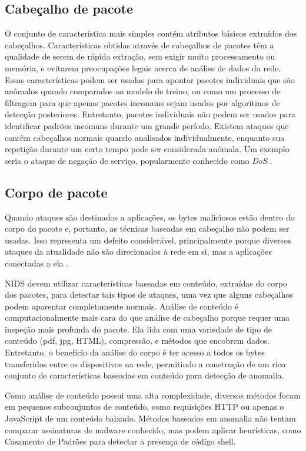 \subsection{Cabeçalho de pacote}
O conjunto de característica mais simples contém atributos básicos extraídos dos cabeçalhos.
Características obtidas através de  cabeçalhos de pacotes têm a qualidade de serem de rápida extração, sem exigir muito
processamento ou memória, e evitarem preocupações legais acerca de análise de dados da rede.
Essas características podem ser usadas para apontar pacotes individuais que são anômalos quando comparados ao modelo de
treino; ou como um processo de filtragem para que apenas pacotes incomuns sejam usados por algoritmos de detecção
posteriores.
Entretanto, pacotes individuais não podem ser usados para identificar padrões incomuns durante um grande período.
Existem ataques que contêm cabeçalhos normais quando analisados individualmente, enquanto sua repetição durante
um certo tempo pode ser considerada anômala. Um exemplo seria o ataque de negação de serviço, popularmente conhecido
como \textit{DoS} \cite{catania12}.

\subsection{Corpo de pacote}
Quando ataques são destinados a aplicações, os bytes maliciosos estão dentro do corpo do
pacote e, portanto, as técnicas baseadas em cabeçalho não podem ser usadas. Isso representa um defeito considerável,
principalmente porque diversos ataques da atualidade não são direcionados à rede em si, mas a aplicações conectadas a
ela \cite{yaman11}.
\par NIDS devem utilizar características baseadas em conteúdo, extraídas do corpo dos pacotes, para detectar tais tipos 
de ataques, uma vez que alguns cabeçalhos podem aparentar completamente normais. Análise de conteúdo é computacionalmente
mais cara do que análise de cabeçalho porque requer uma inspeção mais profunda do pacote. Ela lida com uma variedade de
tipo de conteúdo (pdf, jpg, HTML), compressão, e métodos que encobrem dados. Entretanto, o benefício da análise do
corpo é ter acesso a todos os bytes transferidos entre os dispositivos na rede, permitindo a construção de um rico
conjunto de características baseadas em conteúdo para detecção de anomalia.
\par Como análise de conteúdo possui uma alta complexidade, diversos métodos focam em pequenos subconjuntos de
conteúdo, como requisições HTTP ou apenas o JavaScript de um conteúdo baixado. Métodos baseados em anomalia não tentam
comparar assinaturas de malware conhecido, mas podem aplicar heurísticas, como Casamento de Padrões para detectar a
presença de código shell.

